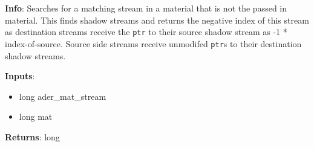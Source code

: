 \textbf{Info}: Searches for a matching stream in a material that is not the
passed in material. This finds shadow streams and returns the negative index
of this stream as destination streams receive the \texttt{ptr} to their source
shadow stream as -1 * index-of-source. Source side streams receive unmodifed
\texttt{ptr}s to their destination shadow streams. 

\noindent \textbf{Inputs}:
\begin{itemize}
\item{long ader\_mat\_stream}
\item{long mat}
\end{itemize}

\noindent \textbf{Returns}: long
